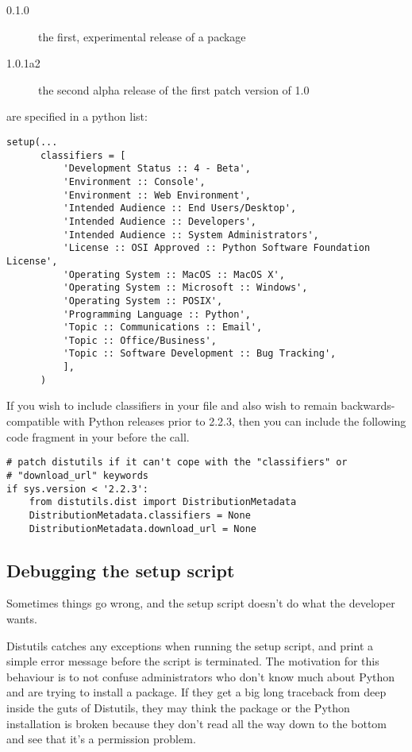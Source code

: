 \documentclass{howto}
\begin{document}
\begin{description}
\item[0.1.0] the first, experimental release of a package
\item[1.0.1a2] the second alpha release of the first patch version of 1.0
\end{description}

 are specified in a python list:

\begin{verbatim}
setup(...
      classifiers = [
          'Development Status :: 4 - Beta',
          'Environment :: Console',
          'Environment :: Web Environment',
          'Intended Audience :: End Users/Desktop',
          'Intended Audience :: Developers',
          'Intended Audience :: System Administrators',
          'License :: OSI Approved :: Python Software Foundation License',
          'Operating System :: MacOS :: MacOS X',
          'Operating System :: Microsoft :: Windows',
          'Operating System :: POSIX',
          'Programming Language :: Python',
          'Topic :: Communications :: Email',
          'Topic :: Office/Business',
          'Topic :: Software Development :: Bug Tracking',
          ],
      )
\end{verbatim}

If you wish to include classifiers in your  file and also
wish to remain backwards-compatible with Python releases prior to 2.2.3,
then you can include the following code fragment in your 
before the  call.

\begin{verbatim}
# patch distutils if it can't cope with the "classifiers" or
# "download_url" keywords
if sys.version < '2.2.3':
    from distutils.dist import DistributionMetadata
    DistributionMetadata.classifiers = None
    DistributionMetadata.download_url = None
\end{verbatim}


\subsection{Debugging the setup script}
\label{meta-data}

Sometimes things go wrong, and the setup script doesn't do what the
developer wants.

Distutils catches any exceptions when running the setup script, and
print a simple error message before the script is terminated.  The
motivation for this behaviour is to not confuse administrators who
don't know much about Python and are trying to install a package.  If
they get a big long traceback from deep inside the guts of Distutils,
they may think the package or the Python installation is broken
because they don't read all the way down to the bottom and see that
it's a permission problem.
\end{document}

